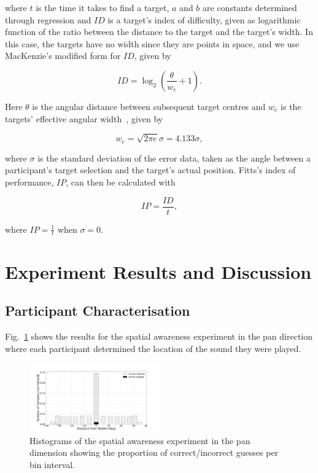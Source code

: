 \documentclass[sigconf, review=true, screen=true, anonymous=true]{acmart}
\begin{document}
\noindent
where $t$ is the time it takes to find a target, $a$ and $b$ are constants determined through regression and $ID$ is a target's index of difficulty, given as logarithmic function of the ratio between the distance to the target and the target's width.
In this case, the targets have no width since they are points in space, and we use MacKenzie's modified form for $ID$, given by

\begin{equation}
  \label{eq:fitts-id}
  ID = \log_2\left(\frac{\theta}{w_e} + 1\right).
\end{equation}

\noindent
Here $\theta$ is the angular distance between subsequent target centres and $w_e$ is the targets' effective angular width~\cite{welford1968fundamentals}, given by

\begin{equation}
  \label{eq:fitts-we}
  w_e = \sqrt{2\pi e}\sigma = 4.133\sigma,
\end{equation}

\noindent
where $\sigma$ is the standard deviation of the error data, taken as the angle between a participant's target selection and the target's actual position. 
Fitts's index of performance, $IP$, can then be calculated with 

\begin{equation}
  \label{eq:fitts-performance}
  IP = \frac{ID}{t},
\end{equation}

\noindent
where $IP = \frac{1}{t}$ when $\sigma=0$.

\section{Experiment Results and Discussion}
\label{sec:results}

\subsection{Participant Characterisation}
\label{sec:character}

Fig.~\ref{fig:location-guesses} shows the results for the spatial awareness experiment in the pan direction where each participant determined the location of the sound they were played. 

\begin{figure}
  \centering
  \includegraphics[clip, trim=100 20 150 100, width=0.5\textwidth]{figures/location_guesses_sighted.png}
  \caption{Histograms of the spatial awareness experiment in the pan dimension showing the proportion of correct/incorrect guesses per bin interval. }
  \label{fig:location-guesses}
\end{figure}
\end{document}
